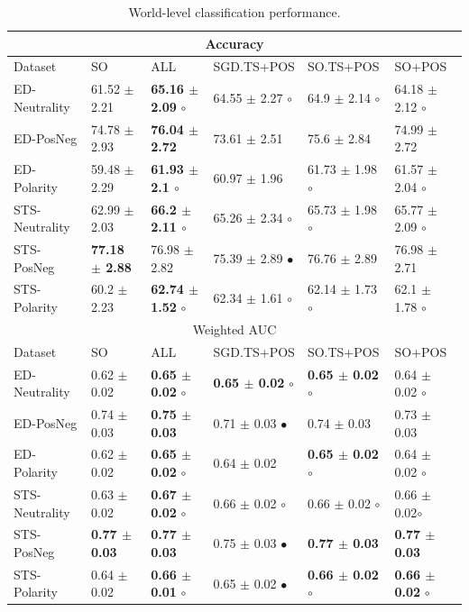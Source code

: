 \documentclass{sig-alternate}
\begin{document}
\begin{table}[!htb]
\begin{center}
\begin{tabular}{l|l|l|l|l|l}
\hline \hline
\multicolumn{ 6}{c}{Accuracy } \\ \hline \hline
Dataset & SO & ALL & SGD.TS+POS & SO.TS+POS & SO+POS \\ \hline
ED-Neutrality & 61.52 $\pm$ 2.21 & \textbf{65.16 $\pm$ 2.09} $\circ$ & 64.55 $\pm$ 2.27 $\circ$ & 64.9 $\pm$ 2.14  $\circ$ & 64.18 $\pm$ 2.12 $\circ$ \\ 
ED-PosNeg & 74.78 $\pm$ 2.93 & \textbf{76.04 $\pm$ 2.72} & 73.61 $\pm$ 2.51 & 75.6 $\pm$ 2.84 & 74.99 $\pm$ 2.72 \\ 
ED-Polarity & 59.48 $\pm$ 2.29 & \textbf{61.93 $\pm$ 2.1 $\circ$} & 60.97 $\pm$ 1.96 & 61.73 $\pm$ 1.98 $\circ$ & 61.57 $\pm$ 2.04 $\circ$ \\  \hline
STS-Neutrality & 62.99 $\pm$ 2.03 & \textbf{66.2 $\pm$ 2.11 $\circ$} & 65.26 $\pm$ 2.34 $\circ$ & 65.73 $\pm$ 1.98 $\circ$ & 65.77 $\pm$ 2.09 $\circ$ \\ 
STS-PosNeg & \textbf{77.18 $\pm$ 2.88} & 76.98 $\pm$ 2.82 & 75.39 $\pm$ 2.89 $\bullet$ & 76.76 $\pm$ 2.89 & 76.98 $\pm$ 2.71 \\ 
STS-Polarity & 60.2 $\pm$ 2.23 & \textbf{62.74 $\pm$ 1.52} $\circ$ & 62.34 $\pm$ 1.61 $\circ$ & 62.14 $\pm$ 1.73 $\circ$ & 62.1 $\pm$ 1.78 $\circ$ \\  \hline \hline
\multicolumn{ 6}{c}{Weighted AUC } \\ \hline \hline
Dataset & SO & ALL & SGD.TS+POS & SO.TS+POS & SO+POS \\ \hline
ED-Neutrality & 0.62 $\pm$ 0.02 &  \textbf{0.65 $\pm$ 0.02} $\circ$ & \textbf{0.65 $\pm$ 0.02} $\circ$  & \textbf{0.65 $\pm$ 0.02} $\circ$ & 0.64 $\pm$ 0.02 $\circ$ \\ 
ED-PosNeg & 0.74 $\pm$ 0.03 & \textbf{0.75 $\pm$ 0.03} & 0.71 $\pm$ 0.03 $\bullet$ & 0.74 $\pm$ 0.03 & 0.73 $\pm$ 0.03 \\ 
ED-Polarity & 0.62 $\pm$ 0.02 &  \textbf{0.65 $\pm$0.02} $\circ$ & 0.64 $\pm$ 0.02 & \textbf{0.65 $\pm$ 0.02} $\circ$ & 0.64 $\pm$ 0.02 $\circ$ \\ \hline
STS-Neutrality & 0.63 $\pm$ 0.02 & \textbf{0.67 $\pm$ 0.02} $\circ$             & 0.66 $\pm$ 0.02 $\circ$  & 0.66 $\pm$ 0.02 $\circ$ & 0.66 $\pm$ 0.02$\circ$ \\ 
STS-PosNeg & \textbf{0.77 $\pm$ 0.03} &  \textbf{0.77 $\pm$ 0.03} & 0.75 $\pm$ 0.03 $\bullet$ & \textbf{0.77 $\pm$ 0.03} & \textbf{0.77 $\pm$ 0.03} \\ 
STS-Polarity & 0.64 $\pm$ 0.02 & \textbf{0.66 $\pm$ 0.01} $\circ$  & 0.65 $\pm$ 0.02 $\bullet$  & \textbf{0.66 $\pm$ 0.02} $\circ$ & \textbf{0.66 $\pm$ 0.02} $\circ$ \\ \hline 
\end{tabular}
\end{center}
\caption{World-level classification performance.} 
\label{tab:classres}
\end{table}
\end{document}
